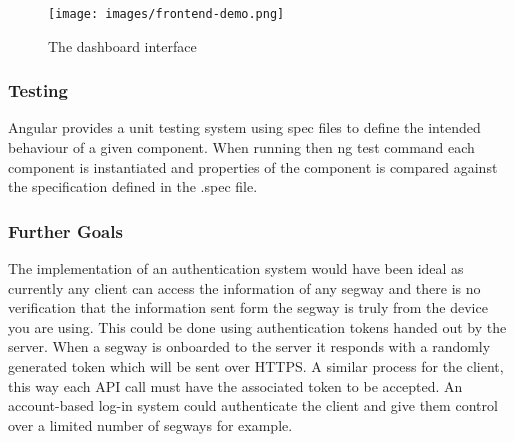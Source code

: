 \begin{figure}
    \centerline{\texttt{[image: images/frontend-demo.png]}}
    \caption{The dashboard interface}
\end{figure}

\subsubsection*{Testing}
Angular provides a unit testing system using spec files to define the intended behaviour of a given component. When running then ng test command each component is instantiated and properties of the component is compared against the specification defined in the .spec file.

\subsubsection*{Further Goals}
The implementation of an authentication system would have been ideal 
as currently any client can access the information of any segway and
there is no verification that the information sent form the segway is
truly from the device you are using. This could be done using authentication tokens
handed out by the server. When a segway is onboarded to the server
it responds with a randomly generated token which will be sent 
over HTTPS. A similar process for the client, this way each API
call must have the associated token to be accepted. 
An account-based log-in system could authenticate the client 
and give them control over a limited number of segways for example.